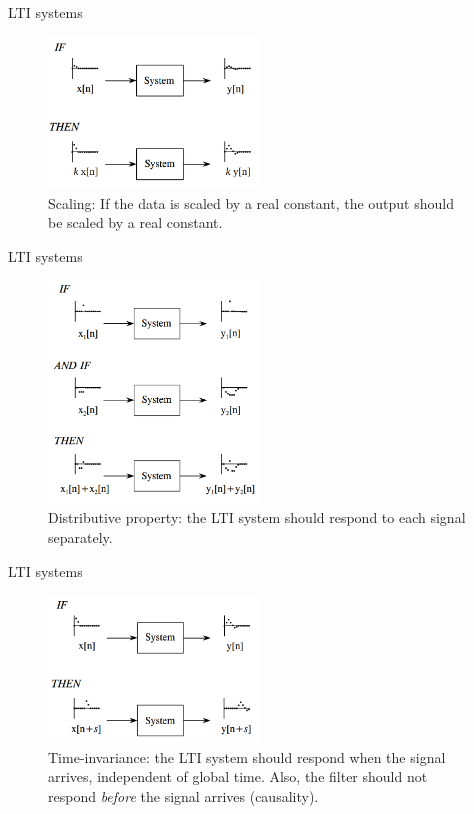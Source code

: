 \documentclass{beamer}
\begin{document}
\begin{frame}{LTI systems}
\begin{figure}
\centering
\includegraphics[width=0.5\textwidth]{figures/LTI3.png}
\caption{\label{fig:LTI3} Scaling: If the data is scaled by a real constant, the output should be scaled by a real constant.}
\end{figure}
\end{frame}

\begin{frame}{LTI systems}
\begin{figure}
\centering
\includegraphics[width=0.5\textwidth]{figures/LTI4.png}
\caption{\label{fig:LTI4} Distributive property: the LTI system should respond to each signal separately.}
\end{figure}
\end{frame}

\begin{frame}{LTI systems}
\begin{figure}
\centering
\includegraphics[width=0.5\textwidth]{figures/LTI5.png}
\caption{\label{fig:LTI5} Time-invariance: the LTI system should respond when the signal arrives, independent of global time. Also, the filter should not respond \textit{before} the signal arrives (causality).}
\end{figure}
\end{frame}
\end{document}
